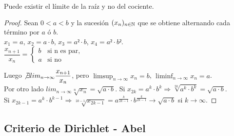 \begin{eg}
  Puede existir el límite de la raíz y no del cociente.

  \begin{proof}
    Sean $0 < a < b$ y la sucesión $(x_n)_{n \in \mathbb{N}}$ que se obtiene alternando cada término por $a$ ó $b$. \\
    $x_1 = a$, $x_2 = a \cdot b$, $x_3 = a² \cdot b$, $x_4 = a² \cdot b²$. \\

    $\dfrac{x_{n+1}}{x_n} = \begin{cases}
      b & \text{si n es par}, \\
      a & \text{si no}
    \end{cases}$

    Luego $\not \exists lim_{n \to \infty} \dfrac{x_{n+1}}{x_n}$, pero $\limsup_{n \to \infty} x_n = b$, $\liminf_{n \to \infty} x_n = a$. \\
    Por otro lado $lim_{n \to \infty} \sqrt[n]{x_n} = \sqrt{a \cdot b}$. Si $x_{2k} = a^k \cdot b^k \Rightarrow \sqrt[2k]{a^k \cdot b^k} = \sqrt{a \cdot b}$. \\
    Si $x_{2k-1} = a^k \cdot b^{k-1} \Rightarrow \sqrt[2k-1]{x_{2k-1}} = a^{\frac{k}{2k-1}} \cdot b^{\frac{k}{2k-1}} \to \sqrt{a \cdot b}$ si $k \to \infty$.
  \end{proof}
\end{eg}

\subsection{Criterio de Dirichlet - Abel}

